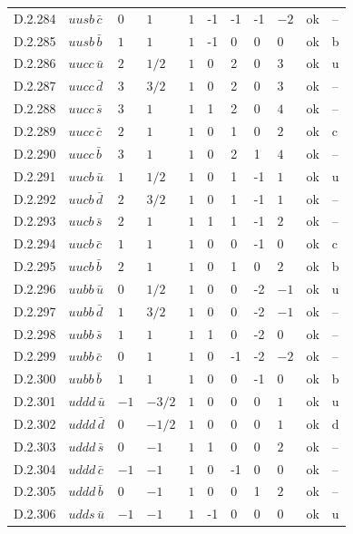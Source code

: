 {\begin{longtable}{@{}llllllllll>{\raggedright\arraybackslash}p{2.0cm}@{}}
D.2.284 & $uusb\,\bar{c}$ & $0$ & $1$ & $1$ & -1 & -1 & -1 & $-2$ & ok & -- \\
D.2.285 & $uusb\,\bar{b}$ & $1$ & $1$ & $1$ & -1 & 0 & 0 & $0$ & ok & b \\
D.2.286 & $uucc\,\bar{u}$ & $2$ & $1/2$ & $1$ & 0 & 2 & 0 & $3$ & ok & u \\
D.2.287 & $uucc\,\bar{d}$ & $3$ & $3/2$ & $1$ & 0 & 2 & 0 & $3$ & ok & -- \\
D.2.288 & $uucc\,\bar{s}$ & $3$ & $1$ & $1$ & 1 & 2 & 0 & $4$ & ok & -- \\
D.2.289 & $uucc\,\bar{c}$ & $2$ & $1$ & $1$ & 0 & 1 & 0 & $2$ & ok & c \\
D.2.290 & $uucc\,\bar{b}$ & $3$ & $1$ & $1$ & 0 & 2 & 1 & $4$ & ok & -- \\
D.2.291 & $uucb\,\bar{u}$ & $1$ & $1/2$ & $1$ & 0 & 1 & -1 & $1$ & ok & u \\
D.2.292 & $uucb\,\bar{d}$ & $2$ & $3/2$ & $1$ & 0 & 1 & -1 & $1$ & ok & -- \\
D.2.293 & $uucb\,\bar{s}$ & $2$ & $1$ & $1$ & 1 & 1 & -1 & $2$ & ok & -- \\
D.2.294 & $uucb\,\bar{c}$ & $1$ & $1$ & $1$ & 0 & 0 & -1 & $0$ & ok & c \\
D.2.295 & $uucb\,\bar{b}$ & $2$ & $1$ & $1$ & 0 & 1 & 0 & $2$ & ok & b \\
D.2.296 & $uubb\,\bar{u}$ & $0$ & $1/2$ & $1$ & 0 & 0 & -2 & $-1$ & ok & u \\
D.2.297 & $uubb\,\bar{d}$ & $1$ & $3/2$ & $1$ & 0 & 0 & -2 & $-1$ & ok & -- \\
D.2.298 & $uubb\,\bar{s}$ & $1$ & $1$ & $1$ & 1 & 0 & -2 & $0$ & ok & -- \\
D.2.299 & $uubb\,\bar{c}$ & $0$ & $1$ & $1$ & 0 & -1 & -2 & $-2$ & ok & -- \\
D.2.300 & $uubb\,\bar{b}$ & $1$ & $1$ & $1$ & 0 & 0 & -1 & $0$ & ok & b \\
D.2.301 & $uddd\,\bar{u}$ & $-1$ & $-3/2$ & $1$ & 0 & 0 & 0 & $1$ & ok & u \\
D.2.302 & $uddd\,\bar{d}$ & $0$ & $-1/2$ & $1$ & 0 & 0 & 0 & $1$ & ok & d \\
D.2.303 & $uddd\,\bar{s}$ & $0$ & $-1$ & $1$ & 1 & 0 & 0 & $2$ & ok & -- \\
D.2.304 & $uddd\,\bar{c}$ & $-1$ & $-1$ & $1$ & 0 & -1 & 0 & $0$ & ok & -- \\
D.2.305 & $uddd\,\bar{b}$ & $0$ & $-1$ & $1$ & 0 & 0 & 1 & $2$ & ok & -- \\
D.2.306 & $udds\,\bar{u}$ & $-1$ & $-1$ & $1$ & -1 & 0 & 0 & $0$ & ok & u \\

\end{longtable}}
